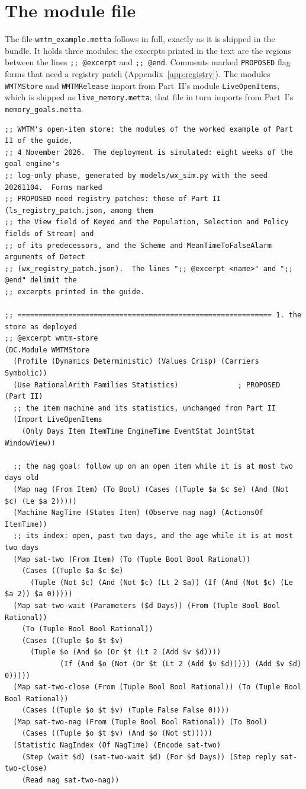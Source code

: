 \documentclass[11pt]{article}
\newcommand{\fpath}[1]{\nolinkurl{#1}}
\newcommand{\code}[1]{\texttt{#1}}
\theoremstyle{definition}
\theoremstyle{plain}
\begin{document}
\section{The module file}\label{app:sources}

The file \fpath{wmtm_example.metta} follows in full, exactly as it is shipped in the bundle. It holds
three modules; the excerpts printed in the text are the regions between the lines
\code{;; @excerpt} and \code{;; @end}. Comments marked \code{PROPOSED} flag forms that need a
registry patch (Appendix~\ref{app:registry}). The modules \code{WMTMStore} and \code{WMTMRelease}
import from Part~II's module \code{LiveOpenItems}, which is shipped as \fpath{live_memory.metta}; that
file in turn imports from Part~I's \fpath{memory_goals.metta}.
\begin{lstlisting}[style=mettafull]
;; WMTM's open-item store: the modules of the worked example of Part II of the guide,
;; 4 November 2026.  The deployment is simulated: eight weeks of the goal engine's
;; log-only phase, generated by models/wx_sim.py with the seed 20261104.  Forms marked
;; PROPOSED need registry patches: those of Part II (ls_registry_patch.json, among them
;; the View field of Keyed and the Population, Selection and Policy fields of Stream) and
;; of its predecessors, and the Scheme and MeanTimeToFalseAlarm arguments of Detect
;; (wx_registry_patch.json).  The lines ";; @excerpt <name>" and ";; @end" delimit the
;; excerpts printed in the guide.

;; ============================================================ 1. the store as deployed
;; @excerpt wmtm-store
(DC.Module WMTMStore
  (Profile (Dynamics Deterministic) (Values Crisp) (Carriers Symbolic))
  (Use RationalArith Families Statistics)              ; PROPOSED (Part II)
  ;; the item machine and its statistics, unchanged from Part II
  (Import LiveOpenItems
    (Only Days Item ItemTime EngineTime EventStat JointStat WindowView))

  ;; the nag goal: follow up on an open item while it is at most two days old
  (Map nag (From Item) (To Bool) (Cases ((Tuple $a $c $e) (And (Not $c) (Le $a 2)))))
  (Machine NagTime (States Item) (Observe nag nag) (ActionsOf ItemTime))
  ;; its index: open, past two days, and the age while it is at most two days
  (Map sat-two (From Item) (To (Tuple Bool Bool Rational))
    (Cases ((Tuple $a $c $e)
      (Tuple (Not $c) (And (Not $c) (Lt 2 $a)) (If (And (Not $c) (Le $a 2)) $a 0)))))
  (Map sat-two-wait (Parameters ($d Days)) (From (Tuple Bool Bool Rational))
    (To (Tuple Bool Bool Rational))
    (Cases ((Tuple $o $t $v)
      (Tuple $o (And $o (Or $t (Lt 2 (Add $v $d))))
             (If (And $o (Not (Or $t (Lt 2 (Add $v $d))))) (Add $v $d) 0)))))
  (Map sat-two-close (From (Tuple Bool Bool Rational)) (To (Tuple Bool Bool Rational))
    (Cases ((Tuple $o $t $v) (Tuple False False 0))))
  (Map sat-two-nag (From (Tuple Bool Bool Rational)) (To Bool)
    (Cases ((Tuple $o $t $v) (And $o (Not $t)))))
  (Statistic NagIndex (Of NagTime) (Encode sat-two)
    (Step (wait $d) (sat-two-wait $d) (For $d Days)) (Step reply sat-two-close)
    (Read nag sat-two-nag))


\end{lstlisting}
\end{document}

